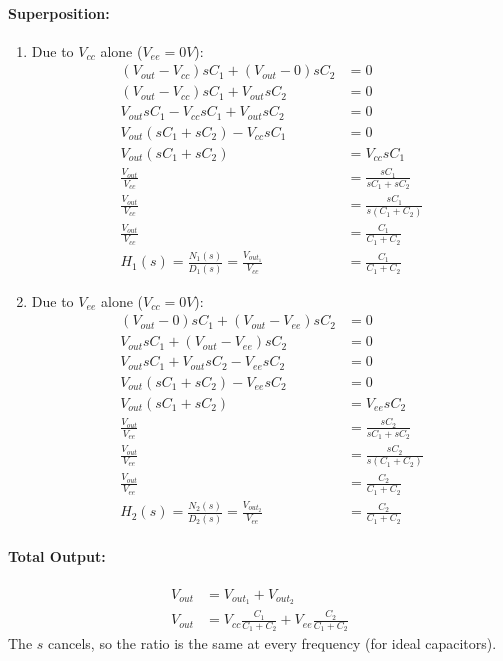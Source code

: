 \paragraph{Superposition:}
\begin{enumerate}
  \item Due to \(V_{cc}\) alone (\(V_{ee} = 0V\)):
    \begin{align*}
      (V_{out} - V_{cc}){sC_1} + (V_{out} - 0){sC_2} &= 0 \\
      (V_{out} - V_{cc}){sC_1} + V_{out}{sC_2} &= 0 \\
      V_{out}sC_1 - V_{cc}sC_1 + V_{out}sC_2 &= 0 \\
      V_{out}(sC_1 + sC_2) - V_{cc}sC_1 &= 0 \\
      V_{out}(sC_1 + sC_2) &= V_{cc}sC_1 \\
      \frac{V_{out}}{V_{cc}} &= \frac{sC_1}{sC_1 + sC_2} \\
      \frac{V_{out}}{V_{cc}} &= \frac{sC_1}{s(C_1 + C_2)} \\
      \frac{V_{out}}{V_{cc}} &= \frac{C_1}{C_1 + C_2} \\
      H_1(s) = \frac{N_1(s)}{D_1(s)} = \frac{V_{out_1}}{V_{cc}} &= \frac{C_1}{C_1 + C_2}
    \end{align*}
  \item Due to \(V_{ee}\) alone (\(V_{cc} = 0V\)):
    \begin{align*}
      (V_{out} - 0){sC_1} + (V_{out} - V_{ee}){sC_2} &= 0 \\
      V_{out}sC_1 + (V_{out} - V_{ee}){sC_2} &= 0 \\
      V_{out}sC_1 + V_{out}sC_2 - V_{ee}sC_2 &= 0 \\
      V_{out}(sC_1 + sC_2) - V_{ee}sC_2 &= 0 \\
      V_{out}(sC_1 + sC_2) &= V_{ee}sC_2 \\
      \frac{V_{out}}{V_{ee}} &= \frac{sC_2}{sC_1 + sC_2} \\
      \frac{V_{out}}{V_{ee}} &= \frac{sC_2}{s(C_1 + C_2)} \\
      \frac{V_{out}}{V_{ee}} &= \frac{C_2}{C_1 + C_2} \\
      H_2(s) = \frac{N_2(s)}{D_2(s)} = \frac{V_{out_2}}{V_{ee}} &= \frac{C_2}{C_1 + C_2}
    \end{align*}
\end{enumerate}

\paragraph{Total Output:}
\begin{align*}
  V_{out} &= V_{out_1} + V_{out_2} \\
  V_{out} &= V_{cc} \frac{C_1}{C_1 + C_2} + V_{ee} \frac{C_2}{C_1 + C_2}
\end{align*}
The \(s\) cancels, so the ratio is the same at every frequency (for ideal
capacitors).

